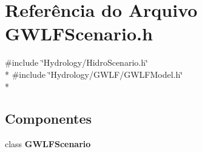 \section{Referência do Arquivo G\+W\+L\+F\+Scenario.\+h}
\label{_g_w_l_f_scenario_8h}
{\ttfamily \#include \char`\"{}Hydrology/\+Hidro\+Scenario.\+h\char`\"{}}\\*
{\ttfamily \#include \char`\"{}Hydrology/\+G\+W\+L\+F/\+G\+W\+L\+F\+Model.\+h\char`\"{}}\\*
\subsection*{Componentes}
\begin{DoxyCompactItemize}
\item 
class {\bf G\+W\+L\+F\+Scenario}
\end{DoxyCompactItemize}
